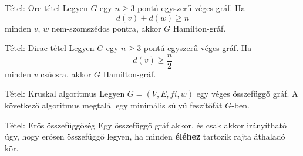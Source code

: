 \documentclass{beamer}
\begin{document}
\begin{frame}

\begin{block}{Tétel: Ore tétel}
Legyen $G$ egy $n \geq 3$ pontú egyszerű véges gráf. Ha $$d(v) + d(w) \geq n$$ minden $v$, $w$ nem-szomszédos pontra, akkor $G$ Hamilton-gráf.

\end{block}

\begin{block}{Tétel: Dirac tétel}
Legyen $G$ egy $n \geq 3$ pontú egyszerű véges gráf. Ha $$d(v) \geq \frac{n}{2}$$ minden $v$ csúcsra, akkor $G$ Hamilton-gráf.

\end{block}

\end{frame}

\begin{frame}

\begin{block}{Tétel: Kruskal algoritmus}
Legyen $G = (V, E, fi , w)$ egy véges összefüggő gráf. A következő algoritmus megtalál egy minimális súlyú feszítőfát $G$-ben.
    
\end{block}


\end{frame}

\begin{frame}

\begin{block}{Tétel: Erős összefüggőség}
Egy összefüggő gráf akkor, és csak akkor irányítható úgy, hogy erősen összefüggő legyen, ha minden \textbf{éléhez} tartozik rajta áthaladó kör.
\end{block}

\end{frame}
\end{document}
